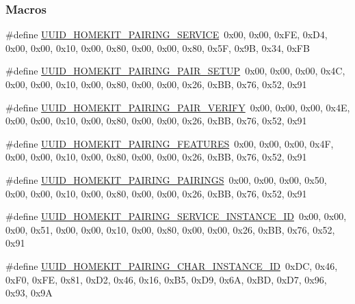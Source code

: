 \subsubsection*{Macros}
\begin{DoxyCompactItemize}
\item 
\#define \hyperlink{group___h_p_s_gae6c1676b1175a75ff30ee3ed95ae593b}{U\+U\+I\+D\+\_\+\+H\+O\+M\+E\+K\+I\+T\+\_\+\+P\+A\+I\+R\+I\+N\+G\+\_\+\+S\+E\+R\+V\+I\+CE}~0x00, 0x00, 0x\+F\+E, 0x\+D4, 0x00, 0x00, 0x10, 0x00, 0x80, 0x00, 0x00, 0x80, 0x5\+F, 0x9\+B, 0x34, 0x\+FB
\item 
\#define \hyperlink{group___h_p_s_ga9c3c4a2c786ef2b12afb57e5797a49cb}{U\+U\+I\+D\+\_\+\+H\+O\+M\+E\+K\+I\+T\+\_\+\+P\+A\+I\+R\+I\+N\+G\+\_\+\+P\+A\+I\+R\+\_\+\+S\+E\+T\+UP}~0x00, 0x00, 0x00, 0x4\+C, 0x00, 0x00, 0x10, 0x00, 0x80, 0x00, 0x00, 0x26, 0x\+B\+B, 0x76, 0x52, 0x91
\item 
\#define \hyperlink{group___h_p_s_ga061d5da62367cb966d7ad586e50ce7c5}{U\+U\+I\+D\+\_\+\+H\+O\+M\+E\+K\+I\+T\+\_\+\+P\+A\+I\+R\+I\+N\+G\+\_\+\+P\+A\+I\+R\+\_\+\+V\+E\+R\+I\+FY}~0x00, 0x00, 0x00, 0x4\+E, 0x00, 0x00, 0x10, 0x00, 0x80, 0x00, 0x00, 0x26, 0x\+B\+B, 0x76, 0x52, 0x91
\item 
\#define \hyperlink{group___h_p_s_ga3bebfb037ee1cf018d0c1350d918087a}{U\+U\+I\+D\+\_\+\+H\+O\+M\+E\+K\+I\+T\+\_\+\+P\+A\+I\+R\+I\+N\+G\+\_\+\+F\+E\+A\+T\+U\+R\+ES}~0x00, 0x00, 0x00, 0x4\+F, 0x00, 0x00, 0x10, 0x00, 0x80, 0x00, 0x00, 0x26, 0x\+B\+B, 0x76, 0x52, 0x91
\item 
\#define \hyperlink{group___h_p_s_gab3bc83b2ae62e6e88d3824cecc9197b7}{U\+U\+I\+D\+\_\+\+H\+O\+M\+E\+K\+I\+T\+\_\+\+P\+A\+I\+R\+I\+N\+G\+\_\+\+P\+A\+I\+R\+I\+N\+GS}~0x00, 0x00, 0x00, 0x50, 0x00, 0x00, 0x10, 0x00, 0x80, 0x00, 0x00, 0x26, 0x\+B\+B, 0x76, 0x52, 0x91
\item 
\#define \hyperlink{group___h_p_s_gac12ba9f81955a84b099e1c80c80fd495}{U\+U\+I\+D\+\_\+\+H\+O\+M\+E\+K\+I\+T\+\_\+\+P\+A\+I\+R\+I\+N\+G\+\_\+\+S\+E\+R\+V\+I\+C\+E\+\_\+\+I\+N\+S\+T\+A\+N\+C\+E\+\_\+\+ID}~0x00, 0x00, 0x00, 0x51, 0x00, 0x00, 0x10, 0x00, 0x80, 0x00, 0x00, 0x26, 0x\+B\+B, 0x76, 0x52, 0x91
\item 
\#define \hyperlink{group___h_p_s_ga3a153b2d857d655662220859386ee3e4}{U\+U\+I\+D\+\_\+\+H\+O\+M\+E\+K\+I\+T\+\_\+\+P\+A\+I\+R\+I\+N\+G\+\_\+\+C\+H\+A\+R\+\_\+\+I\+N\+S\+T\+A\+N\+C\+E\+\_\+\+ID}~0x\+D\+C, 0x46, 0x\+F0, 0x\+F\+E, 0x81, 0x\+D2, 0x46, 0x16, 0x\+B5, 0x\+D9, 0x6\+A, 0x\+B\+D, 0x\+D7, 0x96, 0x93, 0x9A
\end{DoxyCompactItemize}
